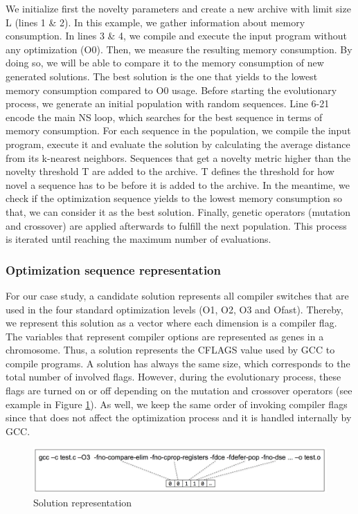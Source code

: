 We initialize first the novelty parameters and create a new archive with limit size L (lines 1 \& 2). In this example, we gather information about memory consumption. In lines 3 \& 4, we compile and execute the input program without any optimization (O0). Then, we measure the resulting memory consumption. By doing so, we will be able to compare it to the memory consumption of new generated solutions. The best solution is the one that yields to the lowest memory consumption compared to O0 usage.
Before starting the evolutionary process, we generate an initial population with random sequences. Line 6-21 encode the main NS loop, which searches for the best sequence in terms of memory consumption. For each sequence in the population, we compile the input program, execute it and evaluate the solution by calculating the average distance from its k-nearest neighbors. Sequences that get a novelty metric higher than the novelty threshold T are added to the archive. T defines the threshold for how novel a sequence has to be before it is added to the archive. In the meantime, we check if the optimization sequence yields to the lowest memory consumption so that, we can consider it as the best solution. 
Finally, genetic operators (mutation and crossover) are applied afterwards to fulfill the next population. This process is iterated until reaching the maximum number of evaluations.


\subsubsection{Optimization sequence representation}
For our case study, a candidate solution represents all compiler switches that are used in the four standard optimization levels (O1, O2, O3 and Ofast). Thereby, we represent this solution as a vector where each dimension is a compiler flag. 
The variables that represent compiler options are represented as genes in a chromosome. 
Thus, a solution represents the CFLAGS value used by GCC to compile programs.
A solution has always the same size, which corresponds to the total number of involved flags. 
However, during the evolutionary process, these flags are turned on or off depending on the mutation and crossover operators (see example in Figure \ref{fig:individual.pdf}). As well, we keep the same order of invoking compiler flags since that does not affect the optimization process and it is handled internally by GCC.

\begin{figure}[h]
	\centering
	\includegraphics[width=1\hsize]{chapitre3/fig/individual.png}
	\caption{Solution representation}
	\label{fig:individual.pdf}
\end{figure}

